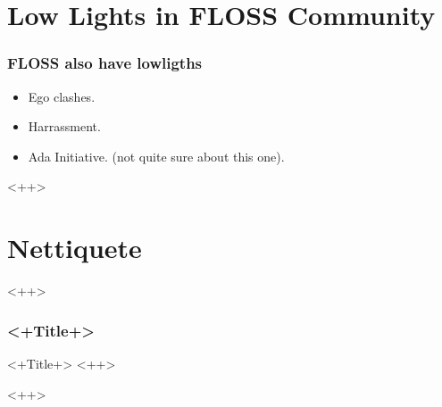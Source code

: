 \documentclass[hyperref={pdfpagelabels=false},xcolor=pst,pdf,fragile]{beamer}
\begin{document}
\section{Low Lights in FLOSS Community}

\begin{frame}
  \frametitle{FLOSS also have lowligths}

  \begin{itemize}
	\item Ego clashes.
	\item Harrassment.
	\item Ada Initiative. (not quite sure about this one).
  \end{itemize}<++>

\end{frame}

\section{Nettiquete}<++>

\begin{frame}
  \frametitle{<+Title+>}

  \begin{block}{<+Title+>} %
    <++>
  \end{block}

\end{frame}

<++>
\end{document}
